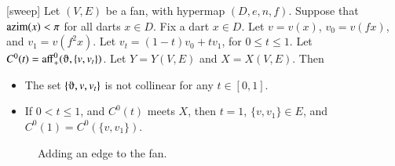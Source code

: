 \begin{lemma}[sweep]\label{lemma:sweep}  
Let $(V,E)$ be a fan, with hypermap $(D,e,n,f)$.  
Suppose that ${\operatorname{azim}}(x)<\pi$
for all darts $x\in D$.  Fix a dart $x\in D$.
Let $v = v(x)$, $v_0 = v(f x)$,
and $v_1 = v(f^2 x)$.  Let $v_t = (1-t) v_0 + t v_1$, for
$0\le t\le 1$.  Let $C^0(t) = \op{aff}_+^0(\orgn,\{v,v_t\})$.
Let $Y = Y(V,E)$ and $X = X(V,E)$.
Then
\begin{itemize}
\item The set $\{\orgn,v,v_t\}$ is not collinear for any $t\in[0,1]$.
\item If $0 < t \le 1$, and $C^0(t)$ meets $X$, then $t=1$, $\{v,v_1\}\in E$, and $C^0(1) = C^0(\{v,v_1\})$.
\end{itemize}
\end{lemma}


\begin{figure}[htb]
  \centering
  \caption{Adding an edge to the fan.}
  \label{fig:vt}
\end{figure}


